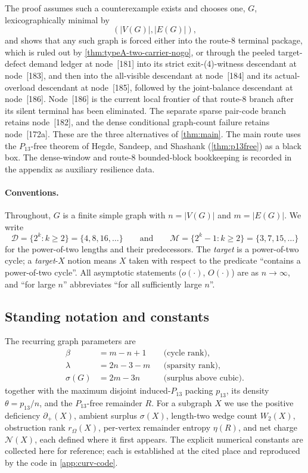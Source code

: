 \documentclass[11pt]{article}
\newcommand{\Mers}{\mathcal M}
\newcommand{\Pow}{\mathcal D}
\newcommand{\defp}{\partial_+}
\newcommand{\No}{\mathcal N}
\begin{document}
The proof assumes such a counterexample exists and chooses one, $G$,
lexicographically minimal by
\[
(|V(G)|,|E(G)|),
\]
and shows that any such graph is forced either into the route-8 terminal
package, which is ruled out by \cref{thm:typeA-two-carrier-nogo}, or through
the peeled target-defect demand ledger at node~[181] into its strict
exit-\textup{(4)}-witness descendant at node~[183], and then into the
all-visible descendant at node~[184] and its actual-overload descendant at
node~[185], followed by the joint-balance descendant at node~[186].
Node~[186] is the current
local frontier of that route-8 branch after its silent terminal has been eliminated.  The separate sparse pair-code branch
retains node~[182], and the dense conditional graph-count failure retains
node~[172a].  These are the three alternatives of \cref{thm:main}.
The main route uses the $P_{13}$-free theorem of
Hegde, Sandeep, and Shashank (\cref{thm:p13free}) as a black box.  The
dense-window and route-8 bounded-block bookkeeping is recorded in the appendix as
auxiliary resilience data.

\paragraph{Conventions.}
Throughout, $G$ is a finite simple graph with $n=|V(G)|$ and $m=|E(G)|$.  We write
\[
\Pow=\{2^{k}:k\ge2\}=\{4,8,16,\dots\}
\qquad\text{and}\qquad
\Mers=\{2^{k}-1:k\ge2\}=\{3,7,15,\dots\}
\]
for the power-of-two lengths and their predecessors.  The \emph{target} is a power-of-two cycle; a \emph{target}-$X$ notion means $X$ taken with respect to the predicate ``contains a power-of-two cycle''.  All asymptotic statements ($o(\cdot)$, $O(\cdot)$) are as $n\to\infty$, and ``for large $n$'' abbreviates ``for all sufficiently large $n$''.

\subsection*{Standing notation and constants}

The recurring graph parameters are
\[
\begin{aligned}
\beta&=m-n+1 &&\text{(cycle rank)},\\
\lambda&=2n-3-m &&\text{(sparsity rank)},\\
\sigma(G)&=2m-3n &&\text{(surplus above cubic)} .
\end{aligned}
\]
together with the maximum disjoint induced-$P_{13}$ packing $p_{13}$, its density $\theta=p_{13}/n$, and the $P_{13}$-free remainder $R$.  For a subgraph $X$ we use the positive deficiency $\defp(X)$, ambient surplus $\sigma(X)$, length-two wedge count $W_2(X)$, obstruction rank $r_\Omega(X)$, per-vertex remainder entropy $\eta(R)$, and net charge $\No(X)$, each defined where it first appears.  The explicit numerical constants are collected here for reference; each is established at the cited place and reproduced by the code in \cref{app:curv-code}.
\end{document}
